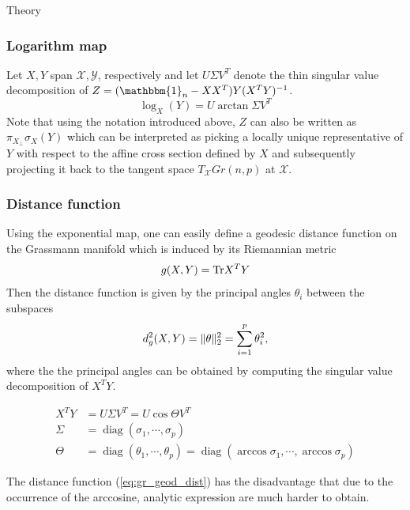 \begin{chapter}{Theory}
\subsubsection{Logarithm map} %
\label{ssub:Logarithm map}
Let $X, Y$ span $\mathcal{X}, \mathcal{Y}$, respectively and let $U\Sigma V^{T}$ denote the thin singular value decomposition of $Z=(\mathbbm{1}_n-XX^T)Y(X^TY)^{-1}$. 
\begin{equation}
\log_X(Y) = U\arctan\Sigma V^T 
\end{equation}
Note that using the notation introduced above, $Z$ can also be written as $\pi_{X_{\bot}}\sigma_X(Y)$ which can be interpreted as
picking a locally unique representative of $Y$ with respect to the affine cross section defined by $X$ and subsequently projecting
it back to the tangent space $T_{\mathcal{X}}Gr(n,p)$ at $\mathcal{X}$. 

\subsubsection{Distance function} %
\label{ssub:Distance function}
Using the exponential map, one can easily define a geodesic distance function on the Grassmann manifold which is induced by its Riemannian metric
\begin{equation}
    g(X,Y) = \textnormal{Tr} X^TY
\end{equation}
Then the distance function is given by the principal angles $\theta_i$ between the subspaces 
\begin{equation}
    \label{eq:gr_geod_dist}
    d_g^2(X,Y) = \| \theta \|_2^2=\sum_{i=1}^p\theta_i^2,
\end{equation}
where the the principal angles can be obtained by computing the singular value decomposition of $X^TY$.

\begin{align}
    X^TY &= U\Sigma V^T = U\cos\Theta V^T\\
    \Sigma &= \operatorname{diag} (\sigma_1,\cdots,\sigma_p)\\
    \Theta &= \operatorname{diag} (\theta_1,\cdots,\theta_p) = \operatorname{diag} (\arccos\sigma_1,\cdots,\arccos\sigma_p)
\end{align}

The distance function (\ref{eq:gr_geod_dist}) has the disadvantage that due to the occurrence of the arccosine,
analytic expression are much harder to obtain.\\


\end{chapter}
